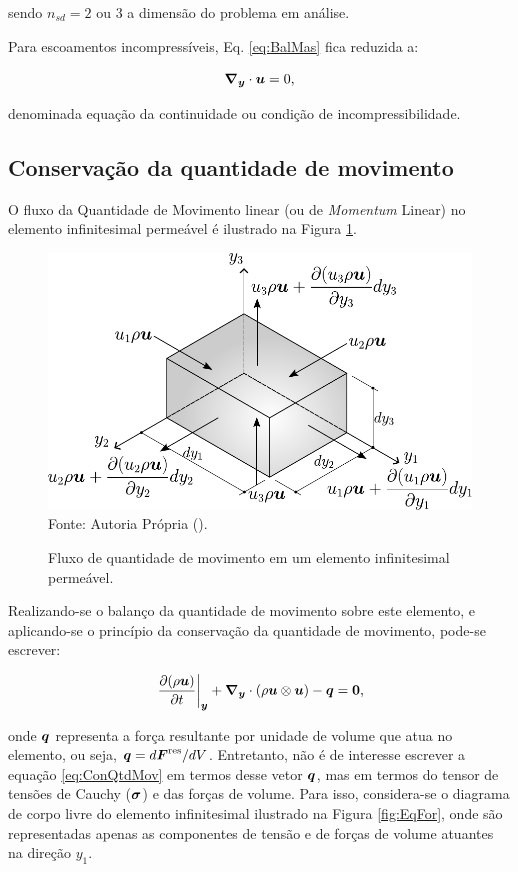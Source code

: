 \noindent sendo $n_{sd}=2$ ou $3$ a dimensão do problema em análise.

Para escoamentos incompressíveis, Eq. \eqref{eq:BalMas} fica reduzida a:

\begin{equation}
    \boldsymbol{\nabla_y}\cdot\boldsymbol{u}=0\text{,}\label{eq:incomp}
\end{equation}

\noindent denominada equação da continuidade ou condição de incompressibilidade.

\subsection{Conservação da quantidade de movimento}

O fluxo da Quantidade de Movimento linear (ou de \textit{Momentum} Linear) no elemento infinitesimal permeável é ilustrado na Figura \ref{fig:ConQtdMov}.

\begin{figure}[h!]
    \centering
    \caption{Fluxo de quantidade de movimento em um elemento infinitesimal permeável.}
    \includegraphics[width=.55\linewidth]{Figuras/ConQtdMov.pdf}
    \\Fonte: Autoria Própria (\the\year).
    \label{fig:ConQtdMov}
\end{figure}

Realizando-se o balanço da quantidade de movimento sobre este elemento, e aplicando-se o princípio da conservação da quantidade de movimento, pode-se escrever:

\begin{equation}
    \left.\frac{\partial{(\rho \boldsymbol{u})}}{\partial{t}}\right|_{\boldsymbol{y}}+\boldsymbol{\nabla_y}\cdot(\rho \boldsymbol{u}\otimes\boldsymbol{u})-\boldsymbol{q}=\boldsymbol{0}\text{,}
    \label{eq:ConQtdMov}
\end{equation}

\noindent onde $\boldsymbol{q}$ representa a força resultante por unidade de volume que atua no elemento, ou seja, $\boldsymbol{q}=d\boldsymbol{F}^\mathrm{res}/dV$. Entretanto, não é de interesse escrever a equação \eqref{eq:ConQtdMov} em termos desse vetor $\boldsymbol{q}$, mas em termos do tensor de tensões de Cauchy ($\boldsymbol{\sigma}$) e das forças de volume. Para isso, considera-se o diagrama de corpo livre do elemento infinitesimal ilustrado na Figura \ref{fig:EqFor}, onde são representadas apenas as componentes de tensão e de forças de volume atuantes na direção $y_1$.

